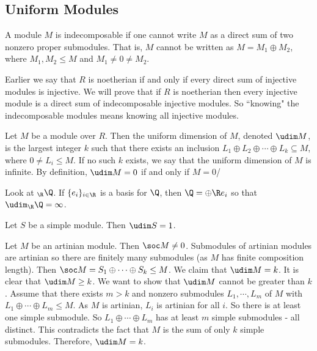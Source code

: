\subsection{Uniform Modules}

\begin{dfn}[Indecomposable]
A module $M$ is indecomposable if one cannot write $M$ as a direct sum of two nonzero proper submodules. That is, $M$ cannot be written as $M=M_1 \oplus M_2$, where $M_1,M_2 \leq M$ and $M_1 \neq 0 \neq M_2$.
\end{dfn}

Earlier we say that $R$ is noetherian if and only if every direct sum of injective modules is injective. We will prove that if $R$ is noetherian then every injective module is a direct sum of indecomposable injective modules. So ``knowing" the indecomposable modules means knowing all injective modules. 

\begin{dfn}
Let $M$ be a module over $R$. Then the uniform dimension of $M$, denoted $\udim M$,  is the largest integer $k$ such that there exists an inclusion $L_1 \oplus L_2 \oplus \cdots \oplus L_k \subseteq M$, where $0 \neq L_i \leq M$. If no such $k$ exists, we say that the uniform dimension of $M$ is infinite. By definition, $\udim M=0$ if and only if $M=0$/
\end{dfn}

\begin{ex}
Look at $_\R \Q$. If $\{e_i\}_{i \in \R}$ is a basis for $\Q$, then $\Q=\oplus \R e_i$ so that $\udim _\R \Q=\infty$.
\end{ex}

\begin{ex}
Let $S$ be a simple module. Then $\udim S=1$.
\end{ex}

\begin{ex}
Let $M$ be an artinian module. Then $\soc M \neq 0$. Submodules of artinian modules are artinian so there are finitely many submodules (as $M$ has finite composition length). Then $\soc M=S_1 \oplus \cdots \oplus S_k \leq M$. We claim that $\udim M=k$. It is clear that $\udim M \geq k$. We want to show that $\udim M$ cannot be greater than $k$. Assume that there exists $m>k$ and nonzero submodules $L_1,\cdots,L_m$ of $M$ with $L_1 \oplus \cdots \oplus L_m \leq M$. As $M$ is artinian, $L_i$ is artinian for all $i$. So there is at least one simple submodule. So $L_1 \oplus \cdots \oplus L_m$ has at least $m$ simple submodules - all distinct. This contradicts the fact that $M$ is the sum of only $k$ simple submodules. Therefore, $\udim M=k$.
\end{ex}


